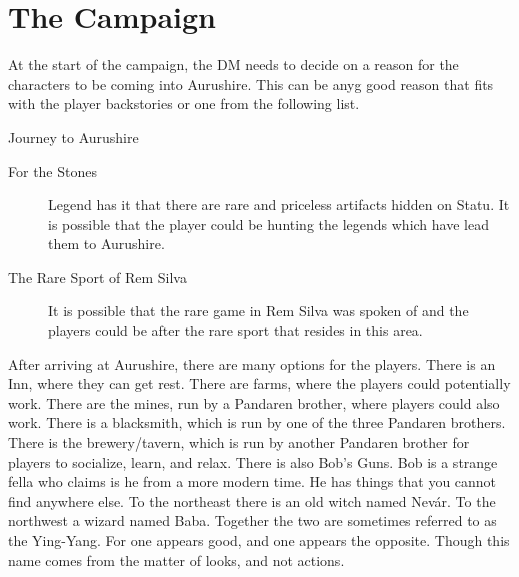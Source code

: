 \chapter{The Campaign}

At the start of the campaign, the DM needs to decide on a reason for the characters to be coming into Aurushire. This can be anyg good reason that fits with the player backstories or one from the following list.

\begin{commentbox}{Journey to Aurushire}
	\begin{description}
		\item[For the Stones] Legend has it that there are rare and priceless artifacts hidden on Statu. It is possible that the player could be hunting the legends which have lead them to Aurushire.
		\item[The Rare Sport of Rem Silva] It is possible that the rare game in Rem Silva was spoken of and the players could be after the rare sport that resides in this area.
	\end{description}
\end{commentbox}

After arriving at Aurushire, there are many options for the players. There is an Inn, where they can get rest. There are farms, where the players could potentially work. There are the mines, run by a Pandaren brother, where players could also work. There is a blacksmith, which is run by one of the three Pandaren brothers. There is the brewery/tavern, which is run by another Pandaren brother for players to socialize, learn, and relax. There is also Bob's Guns. Bob is a strange fella who claims is he from a more modern time. He has things that you cannot find anywhere else. To the northeast there is an old witch named Nev\'{a}r. To the northwest a wizard named Baba. Together the two are sometimes referred to as the Ying-Yang. For one appears good, and one appears the opposite. Though this name comes from the matter of looks, and not actions. 

